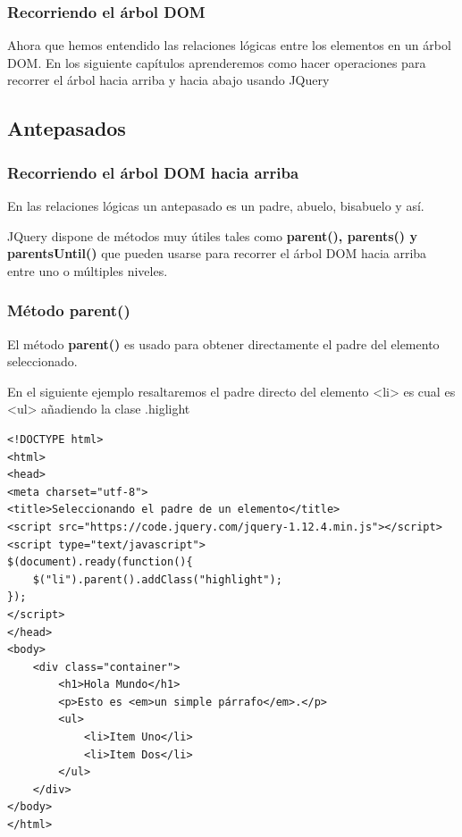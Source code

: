 \documentclass[11pt]{article}
\begin{document}
\subsubsection*{Recorriendo el árbol DOM}
\label{sec:org867b334}

Ahora que hemos entendido las relaciones lógicas entre los elementos en un árbol DOM. En los siguiente capítulos aprenderemos como hacer operaciones para recorrer el árbol hacia arriba y hacia abajo usando JQuery

\subsection*{Antepasados}
\label{sec:org0b3b4f9}

\subsubsection*{Recorriendo el árbol DOM hacia arriba}
\label{sec:org4ba7d0f}

En las relaciones lógicas un antepasado es un padre, abuelo, bisabuelo y así.

JQuery dispone de métodos muy útiles tales como \textbf{parent(), parents() y parentsUntil()} que pueden usarse para recorrer el árbol DOM hacia arriba entre uno o múltiples niveles.

\subsubsection*{Método parent()}
\label{sec:org5eb3fd1}

El método \textbf{parent()} es usado para obtener directamente el padre del elemento seleccionado.

En el siguiente ejemplo resaltaremos el padre directo del elemento <li> es cual es <ul> añadiendo la clase .higlight

\begin{verbatim}
<!DOCTYPE html>
<html>
<head>
<meta charset="utf-8">
<title>Seleccionando el padre de un elemento</title>
<script src="https://code.jquery.com/jquery-1.12.4.min.js"></script>
<script type="text/javascript">
$(document).ready(function(){
    $("li").parent().addClass("highlight");
});
</script>
</head>
<body>
    <div class="container">
        <h1>Hola Mundo</h1>
        <p>Esto es <em>un simple párrafo</em>.</p>
        <ul>
            <li>Item Uno</li>
            <li>Item Dos</li>
        </ul>
    </div>
</body>
</html>                                	
\end{verbatim}
\end{document}
